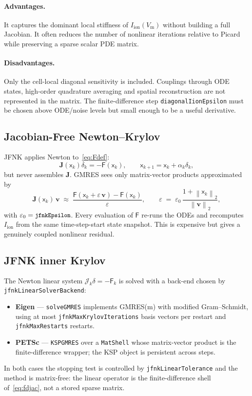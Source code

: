 \documentclass[11pt,a4paper]{article}
\newcommand{\code}[1]{\texttt{\small #1}}
\newcommand{\Vm}{V_{\text{m}}}
\newcommand{\Iion}{I_{\mathrm{ion}}}
\newcommand{\Fres}{\mathsf{F}}
\newcommand{\norm}[1]{\left\lVert #1 \right\rVert}
\begin{document}
\paragraph{Advantages.}
It captures the dominant local stiffness of $\Iion(\Vm)$ without
building a full Jacobian. It often reduces the number of nonlinear
iterations relative to Picard while preserving a sparse scalar PDE
matrix.

\paragraph{Disadvantages.}
Only the cell-local diagonal sensitivity is included. Couplings through
ODE states, high-order quadrature averaging and spatial reconstruction
are not represented in the matrix. The finite-difference step
\code{diagonalIionEpsilon} must be chosen above ODE/noise levels but
small enough to be a useful derivative.

\subsection{Jacobian-Free Newton--Krylov}

JFNK applies Newton to~\eqref{eq:Fdef}:
\[
  \mathbf{J}(\mathsf{x}_k)\delta_k
  =
  -\Fres(\mathsf{x}_k),
  \qquad
  \mathsf{x}_{k+1}=\mathsf{x}_k+\alpha_k\delta_k,
\]
but never assembles $\mathbf{J}$. GMRES sees only matrix-vector
products approximated by
\begin{equation}
  \mathbf{J}(\mathsf{x}_{k})\, \mathbf{v}
   \;\approx\;
   \frac{\Fres(\mathsf{x}_{k} + \varepsilon\, \mathbf{v})
         - \Fres(\mathsf{x}_{k})}{\varepsilon},
   \qquad
   \varepsilon \;=\; \varepsilon_{0}\,
                     \frac{1 + \norm{\mathsf{x}_{k}}_{2}}
                          {\norm{\mathbf{v}}_{2}},
   \label{eq:fdjac}
\end{equation}
with $\varepsilon_{0}=\code{jfnkEpsilon}$. Every evaluation of
$\Fres$ re-runs the ODEs and recomputes $\Iion$ from the same
time-step-start state snapshot. This is expensive but gives a genuinely
coupled nonlinear residual.

\subsection{JFNK inner Krylov}
\label{sec:jfnk-krylov}

The Newton linear system $\mathcal{J}_k\delta=-\Fres_k$ is
solved with a back-end chosen by \code{jfnkLinearSolverBackend}:
\begin{itemize}[nosep]
\item \textbf{Eigen} --- \code{solveGMRES} implements GMRES(m) with modified
  Gram--Schmidt, using at most \code{jfnkMaxKrylovIterations} basis vectors per
  restart and \code{jfnkMaxRestarts} restarts.
\item \textbf{PETSc} --- \code{KSPGMRES} over a \code{MatShell} whose
  matrix-vector product is the finite-difference wrapper; the KSP object is
  persistent across steps.
\end{itemize}
In both cases the stopping test is controlled by \code{jfnkLinearTolerance} and the
method is matrix-free: the linear operator is the finite-difference
shell of~\eqref{eq:fdjac}, not a stored sparse matrix.
\end{document}

